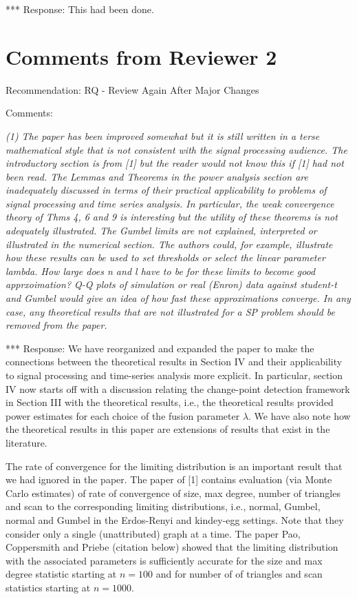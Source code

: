 \documentclass{article}
\begin{document}
*** Response: This had been done.

\section{Comments from Reviewer 2}

Recommendation: RQ - Review Again After Major Changes

Comments:

{\em (1) The paper has been improved somewhat but it is still written in a
terse mathematical style that is not consistent with the signal
processing audience. The introductory section is from [1] but the
reader would not know this if [1] had not been read.  The Lemmas and
Theorems in the power analysis section are inadequately discussed in
terms of their practical applicability to problems of signal
processing and time series analysis. In particular, the weak
convergence theory of Thms 4, 6 and 9 is interesting but the utility
of these theorems is not adequately illustrated.  The Gumbel limits
are not explained, interpreted or illustrated in the numerical
section. The authors could, for example, illustrate how these results
can be used to set thresholds or select the linear parameter
lambda. How large does n and l have to be for these limits to become
good apprxoimation? Q-Q plots of simulation or real (Enron) data
against student-t and Gumbel would give an idea of how fast these
approximations converge.  In any case, any theoretical results that
are not illustrated for a SP problem should be removed from the paper.}

*** Response: We have reorganized and expanded the paper to make the
connections between the theoretical results in Section IV and their
applicability to signal processing and time-series analysis more
explicit. In particular, section IV now starts off with a discussion
relating the change-point detection framework in Section III with the
theoretical results, i.e., the theoretical results provided power
estimates for each choice of the fusion parameter $\lambda$. We have
also note how the theoretical results in this paper are extensions of
results that exist in the literature.

The rate of convergence for the limiting distribution is an important
result that we had ignored in the paper. The paper of [1] contains
evaluation (via Monte Carlo estimates) of rate of convergence of size,
max degree, number of triangles and scan to the corresponding limiting
distributions, i.e., normal, Gumbel, normal and Gumbel in the
Erdos-Renyi and kindey-egg settings. Note that they consider only a
single (unattributed) graph at a time. The paper Pao, Coppersmith and
Priebe (citation below) showed that the limiting distribution with the
associated parameters is sufficiently accurate for the size and max
degree statistic starting at $n = 100$ and for number of of triangles
and scan statistics starting at $n = 1000$.
\end{document}
